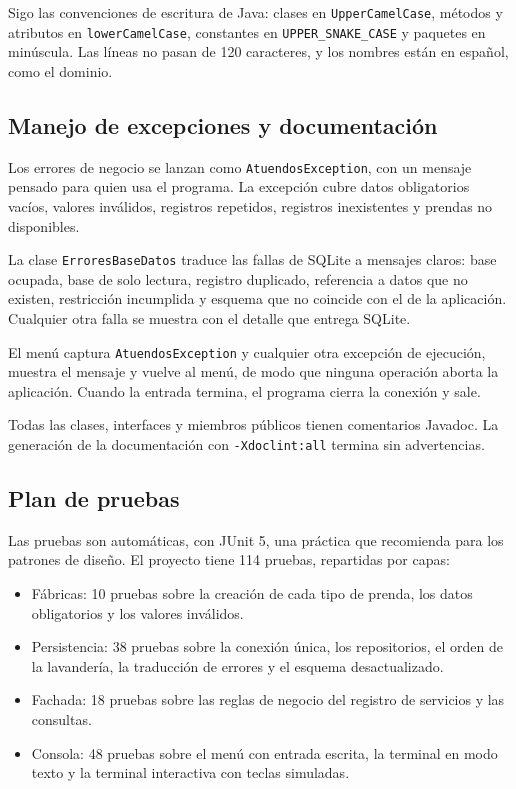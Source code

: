 Sigo las convenciones de escritura de Java: clases en \texttt{UpperCamelCase}, métodos y atributos en \texttt{lowerCamelCase}, constantes en \texttt{UPPER\_SNAKE\_CASE} y paquetes en minúscula. Las líneas no pasan de 120 caracteres, y los nombres están en español, como el dominio.

\subsection{Manejo de excepciones y documentación}

Los errores de negocio se lanzan como \texttt{AtuendosException}, con un mensaje pensado para quien usa el programa. La excepción cubre datos obligatorios vacíos, valores inválidos, registros repetidos, registros inexistentes y prendas no disponibles.

La clase \texttt{ErroresBaseDatos} traduce las fallas de SQLite a mensajes claros: base ocupada, base de solo lectura, registro duplicado, referencia a datos que no existen, restricción incumplida y esquema que no coincide con el de la aplicación. Cualquier otra falla se muestra con el detalle que entrega SQLite.

El menú captura \texttt{AtuendosException} y cualquier otra excepción de ejecución, muestra el mensaje y vuelve al menú, de modo que ninguna operación aborta la aplicación. Cuando la entrada termina, el programa cierra la conexión y sale.

Todas las clases, interfaces y miembros públicos tienen comentarios Javadoc. La generación de la documentación con \texttt{-Xdoclint:all} termina sin advertencias.

\subsection{Plan de pruebas}

Las pruebas son automáticas, con JUnit 5, una práctica que  recomienda para los patrones de diseño. El proyecto tiene 114 pruebas, repartidas por capas:

\begin{itemize}
  \item Fábricas: 10 pruebas sobre la creación de cada tipo de prenda, los datos obligatorios y los valores inválidos.
  \item Persistencia: 38 pruebas sobre la conexión única, los repositorios, el orden de la lavandería, la traducción de errores y el esquema desactualizado.
  \item Fachada: 18 pruebas sobre las reglas de negocio del registro de servicios y las consultas.
  \item Consola: 48 pruebas sobre el menú con entrada escrita, la terminal en modo texto y la terminal interactiva con teclas simuladas.
\end{itemize}

